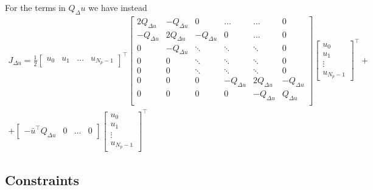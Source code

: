 \documentclass[a4paper,12pt,fleqn]{book}
\newcommand{\Np}{{N_p}}
\begin{document}
 For the terms in $Q_\Delta u$ we have instead
\begin{multline}
 J_{\Delta u} = \frac{1}{2}
 \begin{bmatrix}
  u_0 & u_1 &\dots & u_{\Np-1}
 \end{bmatrix}^\top
  \begin{bmatrix}
  2Q_{\Delta u} & -Q_{\Delta u} &0                  & \dots         & \dots  &   0\\
  -Q_{\Delta u} & 2Q_{\Delta u} &-Q_{\Delta u}      &0              & \dots  &   0\\
  0             & -Q_{\Delta u} &\ddots             & \ddots        &\ddots  &   0\\
  0             & 0             &\ddots             & \ddots        &\ddots  &   0\\  
  0             & 0             &\ddots             & \ddots        &\ddots  &   0\\
  0             & 0             &0                  &-Q_{\Delta u}  & 2Q_{\Delta u} &-Q_{\Delta u}\\  
  0             & 0             &0                  &0              & -Q_{\Delta u} &Q_{\Delta u}\\  
  \end{bmatrix}
 \begin{bmatrix}
  u_0 \\  u_1\\ \vdots\\  u_{\Np-1}
 \end{bmatrix}^\top
 + \\
 +
  \begin{bmatrix}
  -{\bar u}^\top Q_{\Delta u} & 0 & \dots  & 0
 \end{bmatrix}
 \begin{bmatrix}
  u_0 \\ u_1 \\ \vdots \\ u_{\Np-1}
 \end{bmatrix}^\top 
 \end{multline} 
\subsection{Constraints}
\end{document}
